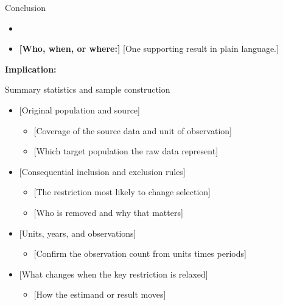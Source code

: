 \documentclass[11pt, aspectratio=169]{beamer}
\begin{document}
\begin{frame}{Conclusion}
  \medskip
  \begin{itemize}\setlength{\itemsep}{1.0em}
    \item {}
    \item \textbf{[Who, when, or where:]}
      [One supporting result in plain language.]
  \end{itemize}
  \bigskip
  \textbf{Implication:} \ResultImplicationSlide
\end{frame}

\AppendixStart

\begin{frame}[t]{Summary statistics and sample construction}
  \hypertarget{app:sumstats}{}%
  \medskip
  \begin{itemize}\setlength{\itemsep}{0.62em}
    \item {} [Original population and source]
      \begin{itemize}
        \item {[Coverage of the source data and unit of observation]}
        \item {[Which target population the raw data represent]}
      \end{itemize}
    \item {} [Consequential inclusion and exclusion rules]
      \begin{itemize}
        \item {[The restriction most likely to change selection]}
        \item {[Who is removed and why that matters]}
      \end{itemize}
    \item {} [Units, years, and observations]
      \begin{itemize}
        \item {[Confirm the observation count from units times periods]}
      \end{itemize}
    \item {} [What changes when the key restriction is relaxed]
      \begin{itemize}
        \item {[How the estimand or result moves]}
      \end{itemize}
  \end{itemize}
\end{frame}
\end{document}
